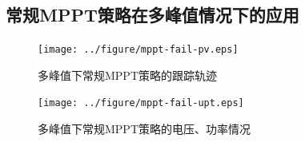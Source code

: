 \documentclass[a4paper,12pt]{article}
\begin{document}
    \subsection{常规MPPT策略在多峰值情况下的应用} %
    \label{sub:常规mppt策略在多峰值情况下的应用}
    \begin{figure}[htbp]
        \centering
        \texttt{[image: ../figure/mppt-fail-pv.eps]}
        \caption{多峰值下常规MPPT策略的跟踪轨迹}
        \label{fig:mppt-fail-pv}
    \end{figure}
    \begin{figure}[htbp]
        \centering
        \texttt{[image: ../figure/mppt-fail-upt.eps]}
        \caption{多峰值下常规MPPT策略的电压、功率情况}
        \label{fig:mppt-fail-upt}
    \end{figure}
\end{document}
